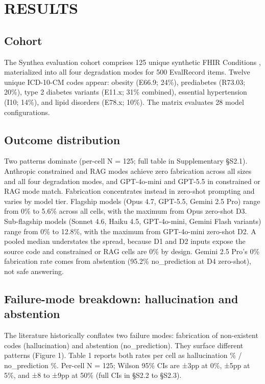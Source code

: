 \section{RESULTS}\label{results}

\subsection{Cohort}\label{cohort}

The Synthea evaluation cohort comprises 125 unique synthetic FHIR
Conditions \autocite{Walonoski2018}, materialized into all four degradation
modes for 500 EvalRecord items. Twelve unique ICD-10-CM codes
appear: obesity (E66.9; 24\%), prediabetes (R73.03; 20\%), type 2
diabetes variants (E11.x; 31\% combined), essential hypertension
(I10; 14\%), and lipid disorders (E78.x; 10\%). The matrix evaluates
28 model configurations.

\subsection{Outcome distribution}\label{outcome-distribution}

Two patterns dominate (per-cell N = 125; full table in
Supplementary §S2.1). Anthropic constrained and RAG modes achieve
zero fabrication across all sizes and all four degradation modes,
and GPT-4o-mini and GPT-5.5 in constrained or RAG mode match.
Fabrication concentrates instead in zero-shot prompting and varies
by model tier. Flagship models (Opus 4.7, GPT-5.5, Gemini 2.5 Pro)
range from 0\% to 5.6\% across all cells, with the maximum from Opus
zero-shot D3. Sub-flagship models (Sonnet 4.6, Haiku 4.5,
GPT-4o-mini, Gemini Flash variants) range from 0\% to 12.8\%, with
the maximum from GPT-4o-mini zero-shot D2. A pooled median
understates the spread, because D1 and D2 inputs expose the source
code and constrained or RAG cells are 0\% by design. Gemini 2.5
Pro's 0\% fabrication rate comes from abstention (95.2\%
no\_prediction at D4 zero-shot), not safe answering.

\subsection{Failure-mode breakdown: hallucination and abstention}\label{failure-mode-breakdown-hallucination-and-abstention}

The literature historically conflates two failure modes:
fabrication of non-existent codes (hallucination) and abstention
(no\_prediction). They surface different patterns (Figure 1).
Table 1 reports both rates per cell as hallucination \% /
no\_prediction \%. Per-cell N = 125; Wilson 95\% CIs are ±3pp at 0\%,
±5pp at 5\%, and ±8 to ±9pp at 50\% (full CIs in §S2.2 to §S2.3).

